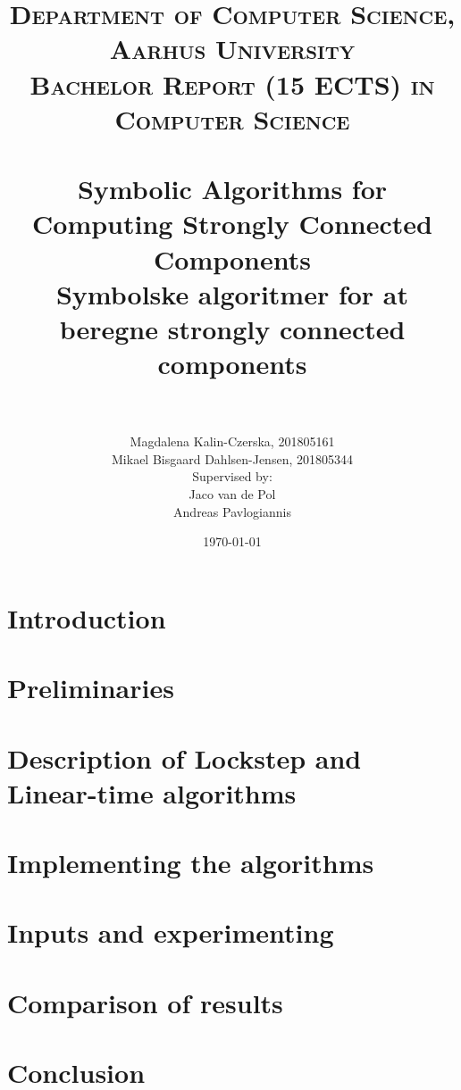 \documentclass[a4, english]{article}
\title{\titlecontent}
\author{\large{Magdalena Kalin-Czerska, 201805161 \\ Mikael Bisgaard Dahlsen-Jensen, 201805344} \\ {\small Supervised by:} \\Jaco van de Pol \\ Andreas Pavlogiannis}
\title{	
  \normalfont \normalsize 
  \textsc{Department of Computer Science, Aarhus University \\ Bachelor Report (15 ECTS) in Computer Science} \\ [20pt] 
  \horrule{0.5pt} \\[0.4cm] %
  \huge Symbolic Algorithms for Computing Strongly Connected Components \\[0.5cm] %
  \large Symbolske algoritmer for at beregne strongly connected components \\ %
  \horrule{2pt} \\[0.5cm] %
}
\date{\today}
\newcommand{\sectionpath}{../sections/}
\begin{document}
\maketitle



\newpage
\tableofcontents
\newpage
\section{Introduction}

\section{Preliminaries}

\section{Description of  Lockstep and Linear-time algorithms}

\section{Implementing the algorithms}


\section{Inputs and experimenting}


\section{Comparison of results}


\section{Conclusion}

\printbibliography
\newpage
\appendix

\end{document}
